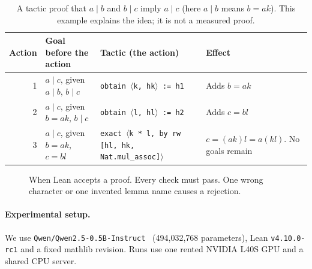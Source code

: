 \documentclass[11pt]{article}
\newcommand{\code}[1]{\texttt{#1}}
\begin{document}
\begin{table}[!htbp]
\centering
\small
\caption{A tactic proof that $a \mid b$ and $b \mid c$ imply $a \mid c$ (here $a \mid b$ means $b = ak$). This example explains the idea; it is not a measured proof.}
\label{tab:example}
\begin{tabularx}{\textwidth}{@{}rP{4.6cm}P{4.3cm}Y@{}}
\toprule
Action & Goal before the action & Tactic (the action) & Effect \\
 & $a \mid c$, given $a \mid b$, $b \mid c$ & \code{obtain $\langle$k, hk$\rangle$ := h1} & Adds $b = a k$ \\
2 & $a \mid c$, given $b = ak$, $b \mid c$ & \code{obtain $\langle$l, hl$\rangle$ := h2} & Adds $c = b l$ \\
3 & $a \mid c$, given $b = ak$, $c = bl$ & \code{exact $\langle$k * l, by rw [hl, hk, Nat.mul\_assoc]$\rangle$} & $c = (ak)l = a(kl)$. No goals remain \\
\bottomrule
\end{tabularx}
\end{table}

\begin{figure}[!htbp]
\centering
{}
\caption{When Lean accepts a proof. Every check must pass. One wrong character or one invented lemma name causes a rejection.}
\label{fig:checker}
\end{figure}

\paragraph{Experimental setup.}
We use \code{Qwen/Qwen2.5-0.5B-Instruct}~\cite{qwen25} (494,032,768 parameters), Lean \code{v4.10.0-rc1} and a fixed mathlib revision.
Runs use one rented NVIDIA L40S GPU and a shared CPU server.
\end{document}
